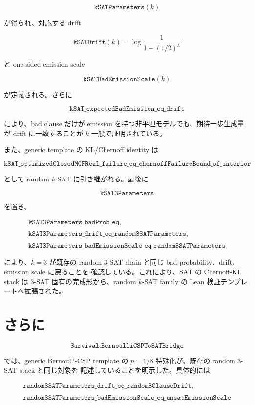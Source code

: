 \documentclass[12pt,a4paper]{article}
\begin{document}
\[
\texttt{kSATParameters}(k)
\]

が得られ、対応する drift

\[
\texttt{kSATDrift}(k)=\log\frac{1}{1-(1/2)^k}
\]

と one-sided emission scale

\[
\texttt{kSATBadEmissionScale}(k)
\]

が定義される。さらに

\[
\texttt{kSAT\_expectedBadEmission\_eq\_drift}
\]

により、bad clause だけが emission を持つ非平坦モデルでも、期待一歩生成量が drift に一致することが \(k\) 一般で証明されている。

また、generic template の KL/Chernoff identity は

\[
\texttt{kSAT\_optimizedClosedMGFReal\_failure\_eq\_chernoffFailureBound\_of\_interior}
\]

として random \(k\)-SAT に引き継がれる。最後に

\[
\texttt{kSAT3Parameters}
\]

を置き、

\[
\begin{aligned}
\texttt{kSAT3Parameters\_badProb\_eq}, \\
\qquad \\
\texttt{kSAT3Parameters\_drift\_eq\_random3SATParameters}, \\
\qquad \\
\texttt{kSAT3Parameters\_badEmissionScale\_eq\_random3SATParameters}
\end{aligned}
\]

により、\(k=3\) が既存の random 3-SAT chain と同じ bad probability、drift、emission scale に戻ることを 確認している。これにより、SAT の Chernoff-KL stack は 3-SAT 固有の完成形から、random \(k\)-SAT family の Lean 検証テンプレートへ拡張された。

\section{さらに}\label{ux3055ux3089ux306b-32}

\[
\texttt{Survival.BernoulliCSPToSATBridge}
\]

では、generic Bernoulli-CSP template の \(p=1/8\) 特殊化が、既存の random 3-SAT stack と同じ対象を 記述していることを明示した。具体的には

\[
\begin{aligned}
\texttt{random3SATParameters\_drift\_eq\_random3ClauseDrift}, \\
\qquad \\
\texttt{random3SATParameters\_badEmissionScale\_eq\_unsatEmissionScale}
\end{aligned}
\]
\end{document}
